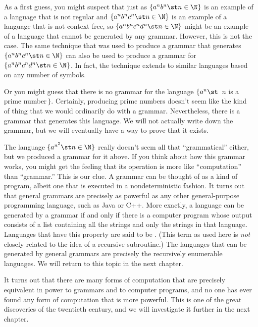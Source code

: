 As a first guess, you might suspect that just as $\{a^nb^n \st n\in\N\}$
is an example of a language that is not regular and
$\{a^nb^nc^n\st n\in\N\}$ is an example of a language that is not
context-free, so $\{a^nb^nc^nd^n\st n\in\N\}$ might be an example
of a language that cannot be generated by any grammar.  However,
this is not the case.  The same technique that was used
to produce a grammar that generates $\{a^nb^nc^n\st n\in\N\}$ can
also be used to produce a grammar for $\{a^nb^nc^nd^n\st n\in\N\}$.
In fact, the technique extends to similar languages based on any
number of symbols.

Or you might guess that there is no grammar for the
language $\{a^n\st\,$ $n$ is a prime number$\,\}$.  Certainly, producing
prime numbers doesn't seem like the kind of thing that we would
ordinarily do with a grammar.  Nevertheless, there is a grammar that
generates this language.  We will not actually write down the grammar,
but we will eventually have a way to prove that it exists.

The language $\{a^{n^2}\st n\in\N\}$ really doesn't seem all that
``grammatical'' either, but we produced a grammar for it above.
If you think about how this grammar works, you might get the feeling
that its operation is more like ``computation'' than ``grammar.''
This is our clue.  A grammar can be thought of as a kind of program,
albeit one that is executed in a nondeterministic fashion.  It turns
out that general grammars are precisely as powerful as any other
general-purpose programming language, such as Java or C++.  More
exactly, a language can be generated by a grammar if and only if
there is a computer program whose output consists of a list 
containing all the strings and only the
strings in that language.  Languages that have this property
are said to be .  (This term
as used here is {\it not\/} closely related to the idea of a recursive
subroutine.)  The languages that can be generated by general
grammars are precisely the recursively enumerable languages.
We will return to this topic in the next chapter.

It turns out that there are many forms of computation that are
precisely equivalent in power to grammars and to computer programs,
and no one has ever found any form of computation that is more
powerful.  This is one of the great discoveries of the twentieth
century, and we will investigate it further in the next chapter.


